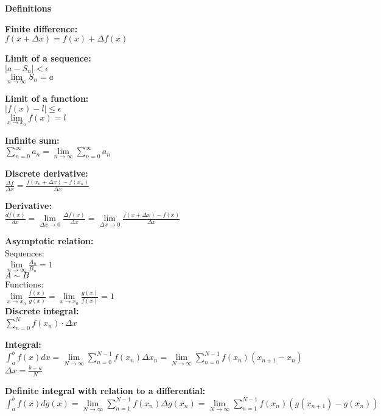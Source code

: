 \documentclass[12pt,a4paper]{report}
\begin{document}
	
	\begin{center}\textbf{Definitions}\end{center}
	
	\textbf{Finite difference:}\\
	$f(x + \Delta x) = f(x) + \Delta f(x)$
	
	\textbf{Limit of a sequence:}\\	
	$|a - S_n| < \epsilon$\\
	$\lim\limits_{n \to \infty} S_n = a$

	\textbf{Limit of a function:}\\
	$|f(x) - l| \leq \epsilon$\\
	$\lim\limits_{x \to x_0} f(x) = l$
	
	\textbf{Infinite sum:}\\
	$\sum_{n = 0}^{\infty} a_n = \lim\limits_{n \to \infty} \sum_{n = 0}^{\infty} a_n$
	
	\textbf{Discrete derivative:}\\
	$\frac{\Delta f}{\Delta x} = \frac{f(x_n + \Delta x) - f(x_n)}{\Delta x}$
	
	\textbf{Derivative:}\\
	$\frac{df(x)}{dx} = \lim\limits_{\Delta x \to 0} \frac{\Delta f(x)}{\Delta x} = \lim\limits_{\Delta x \to 0} \frac{f(x + \Delta x) - f(x)}{\Delta x}$
	
	\textbf{Asymptotic relation:}\\
	Sequences:\\
	$\lim\limits_{n \to \infty} \frac{A_n}{B_n} = 1$\\
	$A \sim B$\\
	Functions:\\
	$\lim\limits_{x \to x_0} \frac{f(x)}{g(x)} = \lim\limits_{x \to x_0} \frac{g(x)}{f(x)} = 1$\\
	
	\textbf{Discrete integral:}\\
	$\sum_{n = 0}^{N} f(x_n) \cdot \Delta x$
	
	\textbf{Integral:}\\
	$\int_{a}^{b} f(x) dx = \lim\limits_{N \to \infty} \sum_{n = 0}^{N - 1} f(x_n) \Delta x_n = \lim\limits_{N \to \infty} \sum_{n = 0}^{N - 1} f(x_n)(x_{n+1} - x_n)$\\
	$\Delta x = \frac{b - a}{N}$
	
	\textbf{Definite integral with relation to a differential:}\\
	$\int_{a}^{b} f(x)dg(x) = \lim\limits_{N \to \infty} \sum_{n = 1}^{N - 1} f(x_n)\Delta g(x_n) = \lim\limits_{N \to \infty} \sum_{n = 1}^{N - 1} f(x_n)(g(x_{n+1}) - g(x_n))$
	
\end{document}
